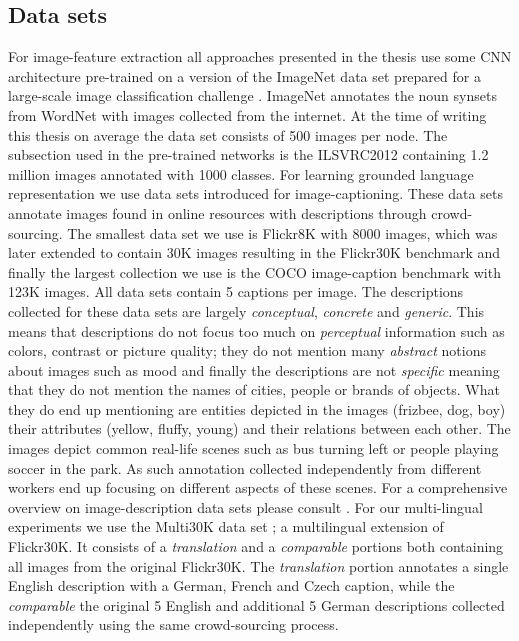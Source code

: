 \subsection{Data sets}
For image-feature extraction all approaches presented in the thesis use some
CNN architecture pre-trained on a version of the ImageNet data set \cite{deng2009imagenet} prepared for a large-scale image classification challenge \cite{russakovsky2015imagenet}. ImageNet annotates the noun synsets from WordNet \cite{miller1995wordnet} with images collected from the internet. At the time of writing this thesis on average the data set consists of 500 images per node. The subsection used in the pre-trained networks is the ILSVRC2012 containing 1.2 million images annotated with 1000 classes. For learning grounded language representation we use data sets introduced for image-captioning. These data sets annotate images found in online resources with descriptions through crowd-sourcing. The smallest data set we use is Flickr8K \cite{hodosh2013framing} with 8000 images, which was later extended to contain 30K images resulting in the Flickr30K benchmark \cite{young2014image} and finally the largest collection we use is the COCO image-caption benchmark \cite{chen2015microsoft} with 123K images. All data sets contain 5 captions per image.
The descriptions collected for these data sets are largely \emph{conceptual}, \emph{concrete} and \emph{generic}. This means that descriptions do not focus too much on \emph{perceptual} information such as colors, contrast or picture quality; they do not mention many \emph{abstract} notions about images such as mood and finally the descriptions are not \emph{specific} meaning that they do not mention the names of cities, people or brands of objects. What they do end up mentioning are entities depicted in the images (frizbee, dog, boy) their attributes (yellow, fluffy, young) and their relations between each other. The images depict common real-life scenes such as bus turning left or people playing soccer in the park. As such annotation collected independently from different workers end up focusing on different aspects of these scenes. For a comprehensive overview on image-description data sets please consult \cite{bernardi2016automatic}.
For our multi-lingual experiments we use the Multi30K data set \cite{elliott2016multi30k,elliott2017findings}; a multilingual extension of Flickr30K. It consists of a {\it translation} and a {\it comparable} portions both containing all images from the original Flickr30K. The \emph{translation} portion annotates a single English description with a German, French and Czech caption, while the \emph{comparable} the original 5 English and additional 5 German descriptions collected independently using the same crowd-sourcing process.


